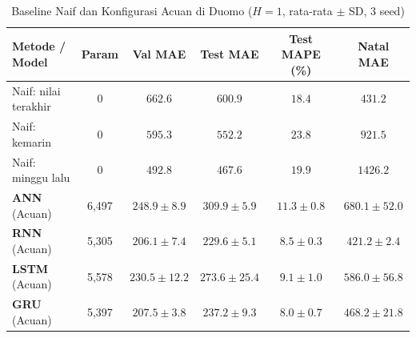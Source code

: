 \begin{table}[t]
  \centering
  \caption{Baseline Naif dan Konfigurasi Acuan di Duomo ($H=1$, rata-rata $\pm$ SD, 3 seed)}
  \label{tab:baseline_acuan}
  \begin{tabular}{@{}lccccc@{}}
    \toprule
    Metode / Model & Param & Val MAE & Test MAE & Test MAPE (\%) & Natal MAE \\
    \midrule
    Naif: nilai terakhir & 0 & $662.6$ & $600.9$ & $18.4$ & $431.2$ \\
    Naif: kemarin & 0 & $595.3$ & $552.2$ & $23.8$ & $921.5$ \\
    Naif: minggu lalu & 0 & $492.8$ & $467.6$ & $19.9$ & $1426.2$ \\
    \midrule
    \textbf{ANN} (Acuan) & 6,497 & $248.9 \pm 8.9$ & $309.9 \pm 5.9$ & $11.3 \pm 0.8$ & $680.1 \pm 52.0$ \\
    \textbf{RNN} (Acuan) & 5,305 & $206.1 \pm 7.4$ & $229.6 \pm 5.1$ & $8.5 \pm 0.3$ & $421.2 \pm 2.4$ \\
    \textbf{LSTM} (Acuan) & 5,578 & $230.5 \pm 12.2$ & $273.6 \pm 25.4$ & $9.1 \pm 1.0$ & $586.0 \pm 56.8$ \\
    \textbf{GRU} (Acuan) & 5,397 & $207.5 \pm 3.8$ & $237.2 \pm 9.3$ & $8.0 \pm 0.7$ & $468.2 \pm 21.8$ \\
    \bottomrule
  \end{tabular}
\end{table}
